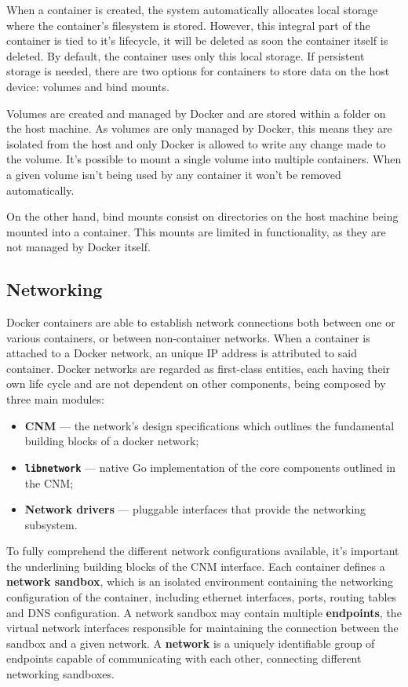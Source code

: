 When a container is created, the system automatically allocates local storage where the container's filesystem is stored. However, this integral part of the container is tied to it's lifecycle, it will be deleted as soon the container itself is deleted. By default, the container uses only this local storage. If persistent storage is needed, there are two options for containers to store data on the host device: volumes and bind mounts\cite{container-storage}.

Volumes are created and managed by Docker and are stored within a folder on the host machine. As volumes are only managed by Docker, this means they are isolated from the host and only Docker is allowed to write any change made to the volume. It's possible to mount a single volume into multiple containers. When a given volume isn't being used by any container it won't be removed automatically.

On the other hand, bind mounts consist on directories on the host machine being mounted into a container. This mounts are limited in functionality, as they are not managed by Docker itself.



\subsection{Networking}
\label{ssec::arch:net}

Docker containers are able to establish network connections both between one or various containers, or between non-container networks. When a container is attached to a Docker network, an unique \acs{IP} address is attributed to said container. Docker networks are regarded as first-class entities, each having their own life cycle and are not dependent on other components, being composed by three main modules\cite{Poulton2020-ju}:

\begin{itemize}
    \item \textbf{\ac{CNM}} --- the network's design specifications which outlines the fundamental building blocks of a docker network;
    \item \textbf{\texttt{libnetwork}} --- native Go implementation of the core components outlined in the \ac{CNM};
    \item \textbf{Network drivers} --- pluggable interfaces that provide the networking subsystem.
\end{itemize}

To fully comprehend the different network configurations available, it's important the underlining building blocks of the \ac{CNM} interface. Each container defines a \textbf{network sandbox}, which is an isolated environment containing the networking configuration of the container, including ethernet interfaces, ports, routing tables and \acs{DNS} configuration. A network sandbox may contain multiple \textbf{endpoints}, the virtual network interfaces responsible for maintaining the connection between the sandbox and a given network. A \textbf{network} is a uniquely identifiable group of endpoints capable of communicating with each other, connecting different networking sandboxes.

